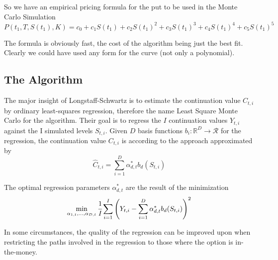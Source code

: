 \documentclass[12pt,a4paper]{book}
\begin{document}
So we have an empirical pricing formula for the put to be used in the Monte Carlo Simulation
\begin{equation}
	P(t_1,T,S(t_1),K)=c_0+c_1 S(t_1) + c_2 S(t_1)^2 + c_3 S(t_1)^3 + c_4 S(t_1)^4 + c_5 S(t_1)^5
\end{equation}

The formula is obviously fast, the cost of the algorithm being just the best fit. Clearly we could have used any form for the curve (not only a polynomial). 

\subsection{The Algorithm}
The major insight of Longstaff-Schwartz is to estimate the continuation value $C_{t,i}$ by ordinary least-squares regression, therefore the name Least Square Monte Carlo for the algorithm. 
Their goal is to regress the $I$ continuation values $Y_{t,i}$ against the I simulated levels $S_{t,i}$. Given $D$ basis functions $b_i:\mathbb{R}^D\rightarrow\mathcal{R}$ for the regression, the continuation value $C_{t,i}$ is according to the approach approximated by
\begin{equation}
	\hat{C}_{t,i}=\sum_{i=1}^D \alpha^*_{d,t}b_d(S_{t,i})
	\label{eq:continuation_approx}
\end{equation}

The optimal regression parameters $\alpha^*_{d,t}$ are the result of the minimization
\begin{equation}
	\min_{\alpha_{1,t},\ldots,\alpha_{D,t}}\cfrac{1}{I}\sum_{i=1}^I \left(Y_{t,i}-\sum_{i=1}^D\alpha^*_{d,t}b_d(S_{t,i})\right)^2
	\label{eq:optimization_alphas}	
\end{equation}

In some circumstances, the quality of the regression can be improved upon when restricting the paths involved in the regression to those where the option is in-the-money.
\end{document}
